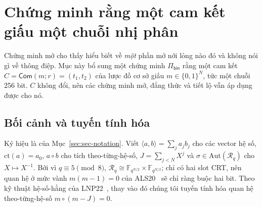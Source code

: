 %

\providecommand{\Rq}{\mathcal{R}_q}
\providecommand{\norm}[1]{\lVert #1 \rVert}
\providecommand{\Adv}{\mathsf{Adv}}
\providecommand{\pid}{\mathit{pid}}
\providecommand{\Cset}{\mathcal{C}}
\providecommand{\Com}{\mathsf{Com}}
\providecommand{\MSIS}{\textsf{M-SIS}}
\providecommand{\MLWE}{\textsf{M-LWE}}
\providecommand{\ct}{\mathrm{ct}}
\providecommand{\Pibin}{\Pi_{\mathsf{bin}}}
\providecommand{\erbr}{\varepsilon_{\mathsf{rbr}}}
\providecommand{\Cdiff}{\bar{\mathcal{C}}}
\providecommand{\Amax}{A_{\max}}

\section{Chứng minh rằng một cam kết giấu một chuỗi nhị phân}
\label{sec:binary-proof}

Chứng minh mở cho thấy hiểu biết về \emph{một} phần mở nới lỏng nào đó và không
nói gì về thông điệp. Mục này bổ sung một chứng minh $\Pibin$ rằng một cam kết
$C=\Com(m;r)=(t_1,t_2)$ của lược đồ cơ sở giấu $m\in\{0,1\}^N$, tức một chuỗi
256 bit. $C$ không đổi, nên các chứng minh mở, đẳng thức và tiết lộ vẫn áp dụng
được cho nó.

\subsection{Bối cảnh và tuyến tính hóa}

Ký hiệu là của Mục~\ref{sec:sec-notation}. Viết
$\langle a,b\rangle=\sum_j a_jb_j$ cho các vector hệ số, $\ct(a)=a_0$,
$a\circ b$ cho tích theo-từng-hệ-số, $J=\sum_{j<N}X^j$ và
$\sigma\in\mathrm{Aut}(\Rq)$ cho $X\mapsto X^{-1}$. Bởi vì $q\equiv5\pmod8$,
$\Rq\cong\mathbb F_{q^{N/2}}\times\mathbb F_{q^{N/2}}$; chỉ có hai slot CRT, nên
quan hệ ở mức vành $m(m-1)=0$ của ALS20~\cite{ref:als20} sẽ chỉ ràng buộc hai
bit. Theo kỹ thuật hệ-số-hằng của LNP22~\cite{ref:lnp22}, thay vào đó chúng tôi
tuyến tính hóa quan hệ theo-từng-hệ-số $m\circ(m-J)=0$.

